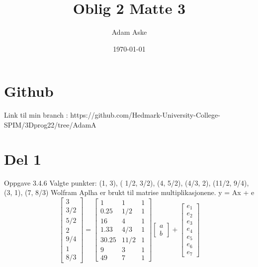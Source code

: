 \documentclass[a4paper,norsk]{article}
\title{Oblig 2 Matte 3}
\date{\today}
\author{Adam Aske}
\begin{document}
\maketitle
\tableofcontents
\newpage
 \section{Github}
Link til min branch : https://github.com/Hedmark-University-College-SPIM/3Dprog22/tree/AdamA
\section{Del 1}
Oppgave 3.4.6
Valgte punkter: (1, 3), ( 1/2, 3/2), (4, 5/2), (4/3, 2), (11/2, 9/4), (3, 1), (7, 8/3)\newline
Wolfram Aplha er brukt til matrise multiplikasjonene. \newline
y = Ax + e \newline
\begin{equation*} 
\begin{bmatrix}3 \\ 3/2 \\ 5/2 \\ 2 \\ 9/4 \\ 1 \\ 8/3\end{bmatrix}
=\begin{bmatrix}1 & 1 & 1 \\ 0.25 & 1/2 & 1 \\16 & 4 & 1 \\1.33 & 4/3 & 1 \\30.25 & 11/2 & 1 \\9 & 3 & 1 \\49 & 7 & 1\end{bmatrix}\begin{bmatrix}a\\b\end{bmatrix}
+ \begin{bmatrix} e_1 \\ e_2 \\ e_3 \\ e_4 \\ e_5 \\ e_6 \\ e_7\end{bmatrix}
\end{equation*}
\end{document}
